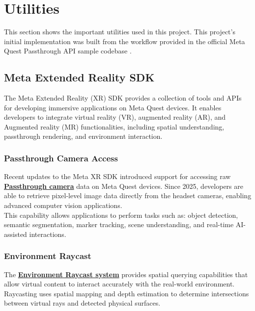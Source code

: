 \documentclass{article}
\begin{document}
\newpage
\section{Utilities}

This section shows the important utilities used in this project.
This project's initial implementation was built from the workflow provided in the official Meta Quest Passthrough API sample codebase \cite{oculus_passthrough_samples}.

\subsection{Meta Extended Reality SDK}

The Meta Extended Reality (XR) SDK provides a collection of tools and APIs for developing immersive applications on Meta Quest devices. It enables developers to integrate virtual reality (VR), augmented reality (AR), and Augmented reality (MR) functionalities, including spatial understanding, passthrough rendering, and environment interaction.

\subsubsection{Passthrough Camera Access}

Recent updates to the Meta XR SDK introduced support for accessing raw \href{https://developers.meta.com/horizon/documentation/spatial-sdk/spatial-sdk-pca-overview/}{\textbf{Passthrough camera}} data on Meta Quest devices. Since 2025, developers are able to retrieve pixel-level image data directly from the headset cameras, enabling advanced computer vision applications.\\

This capability allows applications to perform tasks such as: object detection, semantic segmentation, marker tracking, scene understanding, and real-time AI-assisted interactions.

\subsubsection{Environment Raycast}

The \href{https://developers.meta.com/horizon/documentation/unity/unity-mr-utility-kit-environment-raycast/}{\textbf{Environment Raycast system}} provides spatial querying capabilities that allow virtual content to interact accurately with the real-world environment. Raycasting uses spatial mapping and depth estimation to determine intersections between virtual rays and detected physical surfaces.\\
\end{document}
